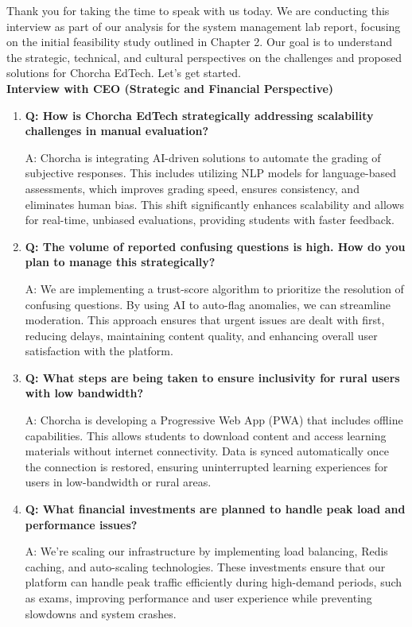 \documentclass[12pt,a4paper,oneside]{book}
\begin{document}
Thank you for taking the time to speak with us today. We are conducting this interview as part of our analysis for the system management lab report, focusing on the initial feasibility study outlined in Chapter 2. Our goal is to understand the strategic, technical, and cultural perspectives on the challenges and proposed solutions for Chorcha EdTech. Let’s get started.\\

\textbf{Interview with CEO (Strategic and Financial Perspective)}



\begin{enumerate}
\item \textbf{Q: How is Chorcha EdTech strategically addressing scalability challenges in manual evaluation?} 

A: Chorcha is integrating AI-driven solutions to automate the grading of subjective responses. This includes utilizing NLP models for language-based assessments, which improves grading speed, ensures consistency, and eliminates human bias. This shift significantly enhances scalability and allows for real-time, unbiased evaluations, providing students with faster feedback.

\item \textbf{Q: The volume of reported confusing questions is high. How do you plan to manage this strategically?} 

A: We are implementing a trust-score algorithm to prioritize the resolution of confusing questions. By using AI to auto-flag anomalies, we can streamline moderation. This approach ensures that urgent issues are dealt with first, reducing delays, maintaining content quality, and enhancing overall user satisfaction with the platform.

\item \textbf{Q: What steps are being taken to ensure inclusivity for rural users with low bandwidth?} 

A: Chorcha is developing a Progressive Web App (PWA) that includes offline capabilities. This allows students to download content and access learning materials without internet connectivity. Data is synced automatically once the connection is restored, ensuring uninterrupted learning experiences for users in low-bandwidth or rural areas.

\item \textbf{Q: What financial investments are planned to handle peak load and performance issues?} 

A: We’re scaling our infrastructure by implementing load balancing, Redis caching, and auto-scaling technologies. These investments ensure that our platform can handle peak traffic efficiently during high-demand periods, such as exams, improving performance and user experience while preventing slowdowns and system crashes.


\end{enumerate}
\end{document}
